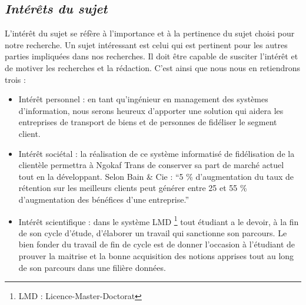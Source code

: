         \subsection[Interet du sujet]{\textit{Intérêts du sujet}}
        L’intérêt du sujet se réfère à l’importance et à la pertinence du sujet choisi pour notre recherche.
        Un sujet intéressant est celui qui est pertinent pour les autres parties impliquées dans nos recherches.
        Il doit être capable de susciter l’intérêt et de motiver les recherches et la rédaction. C’est ainsi
        que nous nous en retiendrons trois :
         \par 
            \begin{itemize}
                \setlength{\itemsep}{0pt}
                \item [\ding{226}] Intérêt personnel : en tant qu’ingénieur en management 
                des systèmes d’information, nous serons heureux d’apporter une solution
                qui aidera les entreprises de transport de biens et de personnes de fidéliser
                le segment client.
                \item [\ding{226}] Intérêt sociétal : la réalisation de ce système
                informatisé de fidélisation de la clientèle permettra à Ngokaf Trans
                de conserver sa part de marché actuel tout en la développant. 
                Selon Bain \& Cie : \enquote{5 \% d’augmentation du taux de
                rétention sur les meilleurs clients peut générer entre 25 et 55 \%
                d’augmentation des bénéfices d’une entreprise.} \cite*{Siecdigi}
                \item [\ding{226}] Intérêt scientifique : dans le système LMD
                \footnote[1]{LMD : Licence-Master-Doctorat} tout étudiant
                a le devoir, à la fin de son cycle d’étude, d’élaborer un travail qui
                sanctionne son parcours. Le bien fonder du travail de fin de cycle
                est de donner l’occasion à l’étudiant de prouver la maitrise et la bonne acquisition
                des notions apprises tout au long de son parcours dans une filière données.
            \end{itemize}
